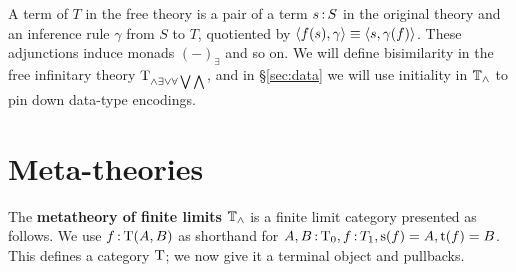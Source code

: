 \documentclass{article}
\begin{document}
A term of $T$ in the free theory is a pair of a term $s\,{:}\, S$ in the original theory and an inference rule $\gamma$ from $S$ to $T$, quotiented by $\langle f(s),\gamma\rangle \equiv \langle s,\gamma(f)\rangle$. These adjunctions induce monads $(-)_\exists$ and so on. We will define bisimilarity in the free infinitary theory $\mathrm{T}_{\land\exists\lor\forall\bigvee\bigwedge}$, and in \S\ref{sec:data} we will use initiality in $\mathbb{T}_\land$ to pin down data-type encodings.

\section{Meta-theories}
\label{app:meta}

\begin{definition}
    The \textbf{metatheory of finite limits} $\mathbb{T}_\land$ is a finite limit category presented as follows.
    We use $f\,{:}\, \mathrm{T}(A,B)$ as shorthand for $A,B\,{:}\, \mathrm{T}_0, f\,{:}\, T_1, \mathrm{s}(f)=A, \mathrm{t}(f) = B$.
    This defines a category $\mathrm{T}$; we now give it a terminal object and pullbacks.
\end{definition}
\end{document}

